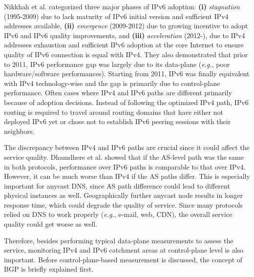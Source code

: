 Nikkhah et al. \cite{7182788} categorized three major phases of IPv6 adoption: \textbf{(i)} \textit{stagnation }(1995-2009) due to lack maturity of IPv6 initial version and sufficient  IPv4 addresses available, \textbf{(ii)} \textit{emergence} (2009-2012) due to growing incentive to adopt IPv6 and IPv6 quality improvements, and \textbf{(iii)} \textit{acceleration} (2012-), due to IPv4 addresses exhaustion and sufficient IPv6 adoption at the core Internet to ensure quality of IPv6 connection is equal with IPv4. They also demonstrated that prior to 2011, IPv6 performance gap was largely due to its data-plane (\textit{e.g.}, poor hardware/software performances). Starting from 2011, IPv6 was finally equivalent with IPv4 technology-wise and the gap is primarily due to control-plane performance. Often cases where IPv4 and IPv6 paths are different primarily because of adoption decisions. Instead of following the optimized IPv4 path, IPv6 routing is required to travel around routing domains that have either not deployed IPv6 yet or chose not to establish IPv6 peering sessions with their neighbors. 

The discrepancy between IPv4 and IPv6 paths are crucial since it could affect the service quality. Dhamdhere et al. \cite{Dhamdhere:2012:MDI:2398776.2398832} showed that if the AS-level path was the same in both protocols, performance over IPv6 paths is comparable to that over IPv4. However, it can be much worse than IPv4 if the AS paths differ. This is especially important for anycast DNS, since AS path difference could lead to different physical instances as well. Geographically further anycast node results in longer response time, which could degrade the quality of service. Since many protocols relied on DNS to work properly (\textit{e.g.}, e-mail, web, CDN), the overall service quality could get worse as well. 

Therefore, besides performing typical data-plane measurements to assess the service, monitoring IPv4 and IPv6 catchment areas at control-plane level is also important. Before control-plane-based measurement is discussed, the concept of BGP is briefly explained first. 


